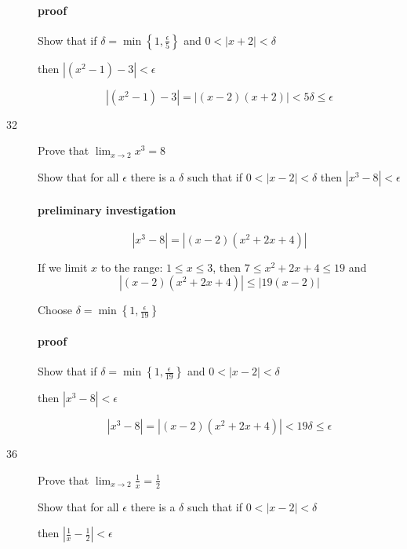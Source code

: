 \documentclass[letterpaper, landscape]{exam}
\begin{document}
\begin{description}
        \paragraph{proof}
        Show that if $\delta = \min \left\{ 1, \frac{\epsilon}{5} \right\}$ and 
        $0 < |x + 2| < \delta$ 
        
        then $| \left( x^2 - 1 \right) - 3 | < \epsilon$

        \[
          | \left( x^2 - 1 \right) - 3 | = |(x - 2)(x + 2)| < 5 \delta \leq \epsilon
        \]

      \item[32] Prove that $\lim_{x \to 2} x^3 = 8$

        Show that for all $\epsilon$ there is a $\delta$ such that if 
        $0 < |x - 2| < \delta$ then $| x^3 - 8 | < \epsilon$

        \paragraph{preliminary investigation}

        \[
          | x^3 - 8 | = |(x - 2) \left(x^2 + 2x + 4\right) | 
        \]

        If we limit $x$ to the range: $1 \leq x \leq 3$, then $7 \leq x^2 + 2x + 4 \leq 19$ and
        \[
          |(x - 2) \left(x^2 + 2x + 4\right) | \leq |19 (x - 2)|
        \]

        Choose $\delta = \min \left\{1, \frac{\epsilon}{19} \right\}$

        \paragraph{proof}
        Show that if $\delta = \min \left\{ 1, \frac{\epsilon}{19} \right\}$ and 
        $0 < |x - 2| < \delta$ 
        
        then $| x^3 - 8 | < \epsilon$

        \[
          | x^3 - 8 | = |(x - 2) \left(x^2 + 2x + 4\right) | < 19 \delta \leq \epsilon
        \]

      \newpage

      \item[36] Prove that $\lim_{x \to 2} \frac{1}{x} = \frac{1}{2}$

        Show that for all $\epsilon$ there is a $\delta$ such that if 
        $0 < |x - 2| < \delta$ 
        
        then $\left| \frac{1}{x} - \frac{1}{2} \right| < \epsilon$


\end{description}
\end{document}
